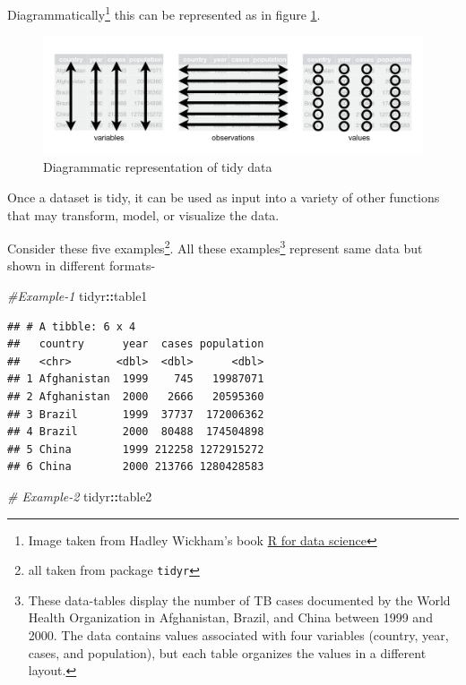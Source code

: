 \documentclass[
]{book}
\newenvironment{Shaded}{\begin{snugshade}}{\end{snugshade}}
\newcommand{\CommentTok}[1]{\textcolor[rgb]{0.56,0.35,0.01}{\textit{#1}}}
\newcommand{\NormalTok}[1]{#1}
\newcommand{\SpecialCharTok}[1]{\textcolor[rgb]{0.81,0.36,0.00}{\textbf{#1}}}
\begin{document}
Diagrammatically\footnote{Image taken from Hadley Wickham's book \href{https://r4ds.had.co.nz/}{R for data science}} this can be represented as in figure \ref{fig:tidy}.

\begin{figure}

{\centering \includegraphics[width=0.99\linewidth]{images/tidy-1} 

}

\caption{Diagrammatic representation of tidy data}\label{fig:tidy}
\end{figure}

Once a dataset is tidy, it can be used as input into a variety of other functions that may transform, model, or visualize the data.

Consider these five examples\footnote{all taken from package \texttt{tidyr}}. All these examples\footnote{These data-tables display the number of TB cases documented by the World Health Organization in Afghanistan, Brazil, and China between 1999 and 2000. The data contains values associated with four variables (country, year, cases, and population), but each table organizes the values in a different layout.} represent same data but shown in different formats-

\begin{Shaded}
\begin{Highlighting}[]
\CommentTok{\#Example{-}1}
\NormalTok{tidyr}\SpecialCharTok{::}\NormalTok{table1}
\end{Highlighting}
\end{Shaded}

\begin{verbatim}
## # A tibble: 6 x 4
##   country      year  cases population
##   <chr>       <dbl>  <dbl>      <dbl>
## 1 Afghanistan  1999    745   19987071
## 2 Afghanistan  2000   2666   20595360
## 3 Brazil       1999  37737  172006362
## 4 Brazil       2000  80488  174504898
## 5 China        1999 212258 1272915272
## 6 China        2000 213766 1280428583
\end{verbatim}

\begin{Shaded}
\begin{Highlighting}[]
\CommentTok{\# Example{-}2}
\NormalTok{tidyr}\SpecialCharTok{::}\NormalTok{table2}
\end{Highlighting}
\end{Shaded}
\end{document}

